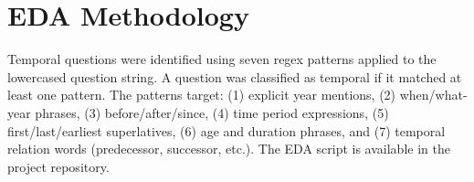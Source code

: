 \documentclass[11pt]{article}
\begin{document}
\section{EDA Methodology}
\label{app:eda}

Temporal questions were identified using seven regex patterns applied
to the lowercased question string. A question was classified as temporal
if it matched at least one pattern. The patterns target: (1) explicit
year mentions, (2) when/what-year phrases, (3) before/after/since,
(4) time period expressions, (5) first/last/earliest superlatives,
(6) age and duration phrases, and (7) temporal relation words
(predecessor, successor, etc.). The EDA script is available in the
project repository.
\end{document}
